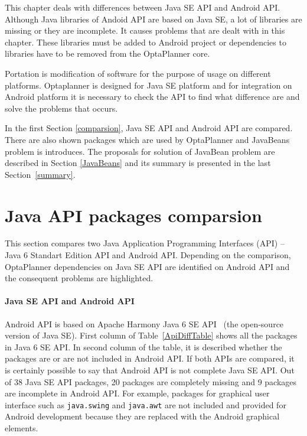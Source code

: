 This chapter deals with differences between Java SE API and Android API. Although Java libraries of Andoid API are based on Java SE, a lot of libraries are missing or they are incomplete. It causes problems that are dealt with in this chapter. These libraries must be added to Android project or dependencies to libraries have to be removed from the OptaPlanner core.

Portation is modification of software for the purpose of usage on different platforms. Optaplanner is designed for Java SE platform and for integration on Android platform it is necessary to check the API to find what difference are and solve the problems that occurs.

In the first Section \ref{comparsion}, Java SE API and Android API are compared. There are also shown packages which are used by OptaPlanner and JavaBeans problem is introduces. The proposals for solution of JavaBean problem are described in Section \ref{JavaBeans} and its summary is presented in the last Section~\ref{summary}.

\section{Java API packages comparsion}\label{ComparsionSection}
This section compares two Java Application Programming Interfaces (API) -- Java 6 Standart Edition API and Android API.
Depending on the comparison, OptaPlanner dependencies on Java SE API are identified on Android API and the consequent
problems are highlighted.

\paragraph{Java SE API and Android API}
Android API is based on Apache Harmony Java 6 SE API~\cite{Apache} (the open-source version of Java SE). First column of
Table~\ref{ApiDiffTable} shows all the packages in Java 6 SE API. In second column of the table, it is described whether
the packages are or are not included in Android API. If both APIs are compared, it is certainly possible to say that
Android API is not complete Java SE API. Out of 38 Java SE API packages, 20 packages are completely missing and 9
packages are incomplete in Android API. For example, packages for graphical user interface such as \texttt{java.swing}
and \texttt{java.awt} are not included and provided for Android development because they are replaced with the Android
graphical elements.

